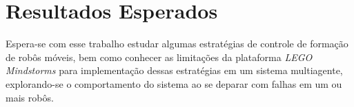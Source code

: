 %
%

\chapter{Resultados Esperados}

Espera-se com esse trabalho estudar algumas estratégias de controle de formação de robôs móveis, bem como conhecer as limitações da plataforma \emph{LEGO Mindstorms} para implementação dessas estratégias em um sistema multiagente, explorando-se o comportamento do sistema ao se deparar com falhas em um ou mais robôs.  




